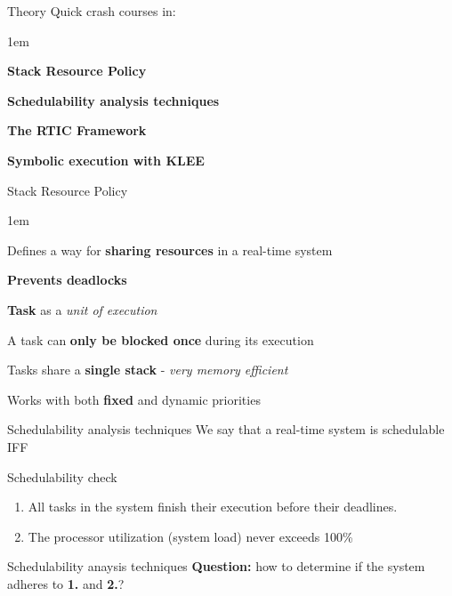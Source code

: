 \begin{frame}{Theory}
    Quick crash courses in:
    \vspace{1em}
    \begin{itemize-size}{1em}
        \item \textbf{Stack Resource Policy}
        \item \textbf{Schedulability analysis techniques}
        \item \textbf{The RTIC Framework}
        \item \textbf{Symbolic execution with KLEE}
    \end{itemize-size}
\end{frame}

\begin{frame}{Stack Resource Policy}
    \begin{itemize-size}{1em}
        \item Defines a way for \textbf{sharing resources} in a real-time system
        \item \textbf{Prevents deadlocks}
        \item \textbf{Task} as a \emph{unit of execution}
        \item A task can \textbf{only be blocked once} during its execution
        \item Tasks share a \textbf{single stack} - \emph{very memory efficient}
        \item Works with both \textbf{fixed} and dynamic priorities
    \end{itemize-size}
\end{frame}

\begin{frame}{Schedulability analysis techniques}
    We say that a real-time system is schedulable IFF
    \begin{block}{Schedulability check}
        \begin{enumerate}
            \item All tasks in the system finish their execution before their deadlines.
            \item The processor utilization (system load) never exceeds 100\%
        \end{enumerate}
    \end{block}
\end{frame}

\begin{frame}{Schedulability anaysis techniques}
    \textbf{Question:} how to determine if the system adheres to \textbf{1.} and \textbf{2.}?
\end{frame}


